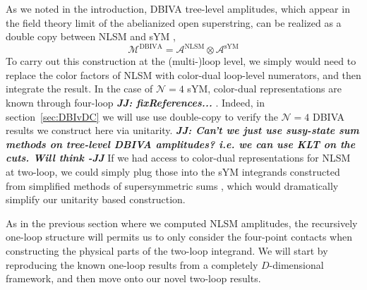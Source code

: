 \documentclass[11pt,letter]{article}
\def\sect#1{section~\ref{#1}}
\def\dj#1{{\color{NUpurple}\it \bf JJ: #1}}
\begin{document}
As we noted in the introduction, DBIVA tree-level amplitudes, which appear in the field theory limit of the abelianized open superstring, can be realized as a {double copy} between NLSM and sYM \cite{Cachazo:2014xea}, 
\begin{equation}
\mathcal{M}^{\text{DBIVA}} = \mathcal{A}^{\text{NLSM}} \otimes \mathcal{A}^{\text{sYM}}
\end{equation}
To carry out this construction at the (multi-)loop level, we simply would need to replace the color factors of NLSM with color-dual loop-level numerators, and then integrate the result. In the case of $\mathcal{N}=4$ sYM, color-dual representations are known through four-loop \dj{fixReferences...} \cite{BCJLoop, GravityFour}. Indeed, in  \sect{sec:DBIvDC} we will use use double-copy to verify the $\mathcal{N}=4$ DBIVA results we construct here via unitarity.  \dj{Can't we just use susy-state sum methods on tree-level DBIVA amplitudes?  i.e. we can use KLT on the cuts. Will think -JJ} If we had access to color-dual representations for NLSM at two-loop, we could simply plug those into the sYM integrands constructed from simplified methods of supersymmetric sums \cite{SuperSum}, which would dramatically simplify our unitarity based construction. 

As in the previous section where we computed NLSM amplitudes, the recursively one-loop structure will permits us to only consider the four-point contacts when constructing the physical parts of the two-loop integrand. We will start by reproducing the known one-loop results from a completely $D$-dimensional framework, and then move onto our novel two-loop results. 
\end{document}

